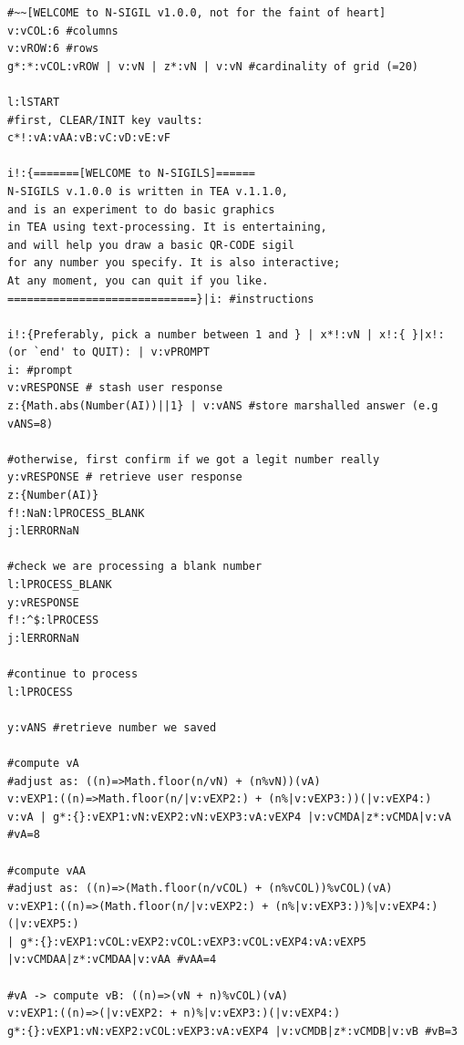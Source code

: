 \documentclass[a4paper, 18pt]{book} %
\begin{document}
 \Large
  \centering
  \begin{tcolorbox}[teaterminalstyle, title=TEA Program: N-SIGIL image generator program, breakable]
  \begin{lstlisting}[language=TEA,breaklines=true]
 #~~[WELCOME to N-SIGIL v1.0.0, not for the faint of heart]
v:vCOL:6 #columns
v:vROW:6 #rows
g*:*:vCOL:vROW | v:vN | z*:vN | v:vN #cardinality of grid (=20)

l:lSTART
#first, CLEAR/INIT key vaults:
c*!:vA:vAA:vB:vC:vD:vE:vF

i!:{=======[WELCOME to N-SIGILS]======
N-SIGILS v.1.0.0 is written in TEA v.1.1.0, 
and is an experiment to do basic graphics 
in TEA using text-processing. It is entertaining,
and will help you draw a basic QR-CODE sigil
for any number you specify. It is also interactive;
At any moment, you can quit if you like.
=============================}|i: #instructions

i!:{Preferably, pick a number between 1 and } | x*!:vN | x!:{ }|x!: (or `end' to QUIT): | v:vPROMPT
i: #prompt
v:vRESPONSE # stash user response
z:{Math.abs(Number(AI))||1} | v:vANS #store marshalled answer (e.g vANS=8)

#otherwise, first confirm if we got a legit number really
y:vRESPONSE # retrieve user response
z:{Number(AI)} 
f!:NaN:lPROCESS_BLANK
j:lERRORNaN 

#check we are processing a blank number
l:lPROCESS_BLANK
y:vRESPONSE
f!:^$:lPROCESS
j:lERRORNaN

#continue to process
l:lPROCESS

y:vANS #retrieve number we saved

#compute vA
#adjust as: ((n)=>Math.floor(n/vN) + (n%vN))(vA)
v:vEXP1:((n)=>Math.floor(n/|v:vEXP2:) + (n%|v:vEXP3:))(|v:vEXP4:)
v:vA | g*:{}:vEXP1:vN:vEXP2:vN:vEXP3:vA:vEXP4 |v:vCMDA|z*:vCMDA|v:vA #vA=8

#compute vAA
#adjust as: ((n)=>(Math.floor(n/vCOL) + (n%vCOL))%vCOL)(vA)
v:vEXP1:((n)=>(Math.floor(n/|v:vEXP2:) + (n%|v:vEXP3:))%|v:vEXP4:)(|v:vEXP5:)
| g*:{}:vEXP1:vCOL:vEXP2:vCOL:vEXP3:vCOL:vEXP4:vA:vEXP5 |v:vCMDAA|z*:vCMDAA|v:vAA #vAA=4
 
#vA -> compute vB: ((n)=>(vN + n)%vCOL)(vA)
v:vEXP1:((n)=>(|v:vEXP2: + n)%|v:vEXP3:)(|v:vEXP4:)
g*:{}:vEXP1:vN:vEXP2:vCOL:vEXP3:vA:vEXP4 |v:vCMDB|z*:vCMDB|v:vB #vB=3


\end{lstlisting}
\end{tcolorbox}
\end{document}
